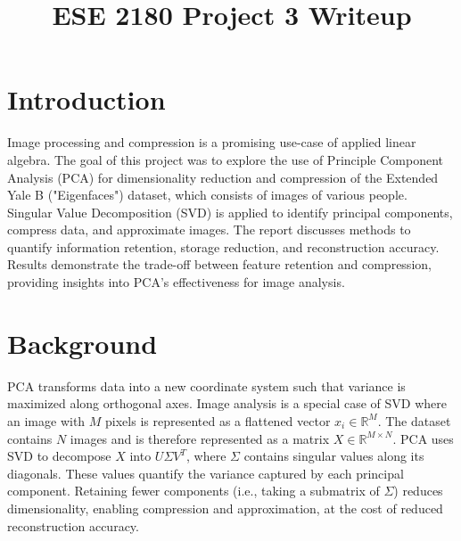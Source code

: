 \documentclass[conference]{IEEEtran}
\begin{document}
\title{ESE 2180 Project 3 Writeup}

\author{
\and
{}
\and
}

\maketitle


\section{Introduction}
Image processing and compression is a promising use-case of applied linear algebra. The goal of this project was to explore the use of Principle Component Analysis (PCA) for dimensionality reduction and compression of the Extended Yale B ("Eigenfaces") dataset, which consists of images of various people. Singular Value Decomposition (SVD) is applied to identify principal components, compress data, and approximate images. The report discusses methods to quantify information retention, storage reduction, and reconstruction accuracy. Results demonstrate the trade-off between feature retention and compression, providing insights into PCA's effectiveness for image analysis.

\section{Background}
PCA transforms data into a new coordinate system such that variance is maximized along orthogonal axes. Image analysis is a special case of SVD where an image with $M$ pixels is represented as a flattened vector $x_i \in \mathbb{R}^M$. The dataset contains $N$ images and is therefore represented as a matrix $X \in \mathbb{R}^{M \times N}$. PCA uses SVD to decompose $X$ into $U \Sigma V^T$, where $\Sigma$ contains singular values along its diagonals. These values quantify the variance captured by each principal component. Retaining fewer components (i.e., taking a submatrix of $\Sigma$) reduces dimensionality, enabling compression and approximation, at the cost of reduced reconstruction accuracy.
\end{document}
